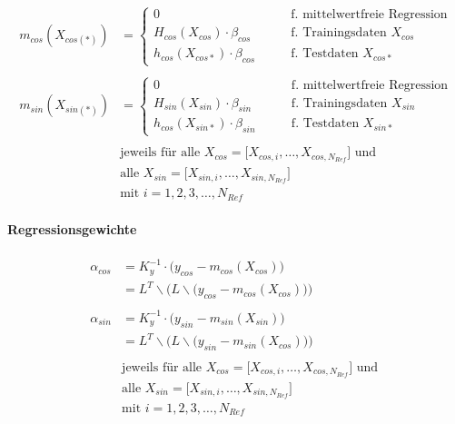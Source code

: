 \begin{align}\label{eq:gprmean}
	m_{cos}(X_{cos(*)}) &=
		\begin{cases}
			0                                    &\qquad \text{f. mittelwertfreie Regression} \\
			H_{cos}(X_{cos}) \cdot \beta_{cos} 	 &\qquad \text{f. Trainingsdaten } X_{cos} \\
			h_{cos}(X_{cos*}) \cdot \beta_{cos} &\qquad \text{f. Testdaten } X_{cos*}
		\end{cases} \nonumber \\
	\\
	m_{sin}(X_{sin(*)}) &=
		\begin{cases}
			0                                    &\qquad \text{f. mittelwertfreie Regression} \\
			H_{sin}(X_{sin}) \cdot \beta_{sin} 	 &\qquad \text{f. Trainingsdaten } X_{sin} \\
			h_{cos}(X_{sin*}) \cdot \beta_{sin} &\qquad \text{f. Testdaten } X_{sin*}
		\end{cases} \nonumber \\
	\nonumber \\
& \text{jeweils für alle } X_{cos} = \big[ X_{cos,i},\dots, X_{cos,N_{Ref}} \big] \text{ und } \nonumber \\
& \text{alle } X_{sin} = \big[ X_{sin,i},\dots, X_{sin,N_{Ref}} \big] \nonumber \\
& \text{mit } i = 1,2,3,\ldots,N_{Ref} \nonumber
\end{align}


\paragraph*{Regressionsgewichte}


\begin{align}\label{eq:gprweights}
	\alpha_{cos} &= K_y^{-1} \cdot \big( y_{cos} - m_{cos}(X_{cos}) \big) \nonumber \\
				 &= L^T \backslash \Big(L \backslash \big( y_{cos} - m_{cos}(X_{cos}) \big) \Big) \nonumber \\
	\\
	\alpha_{sin} &= K_y^{-1} \cdot \big( y_{sin} - m_{sin}(X_{sin}) \big) \nonumber \\
				 &= L^T \backslash \Big(L \backslash \big( y_{sin} - m_{sin}(X_{cos}) \big) \Big) \nonumber \\
	\nonumber \\
& \text{jeweils für alle } X_{cos} = \big[ X_{cos,i},\dots, X_{cos,N_{Ref}} \big] \text{ und } \nonumber \\
& \text{alle } X_{sin} = \big[ X_{sin,i},\dots, X_{sin,N_{Ref}} \big] \nonumber \\
& \text{mit } i = 1,2,3,\ldots,N_{Ref} \nonumber
\end{align}


